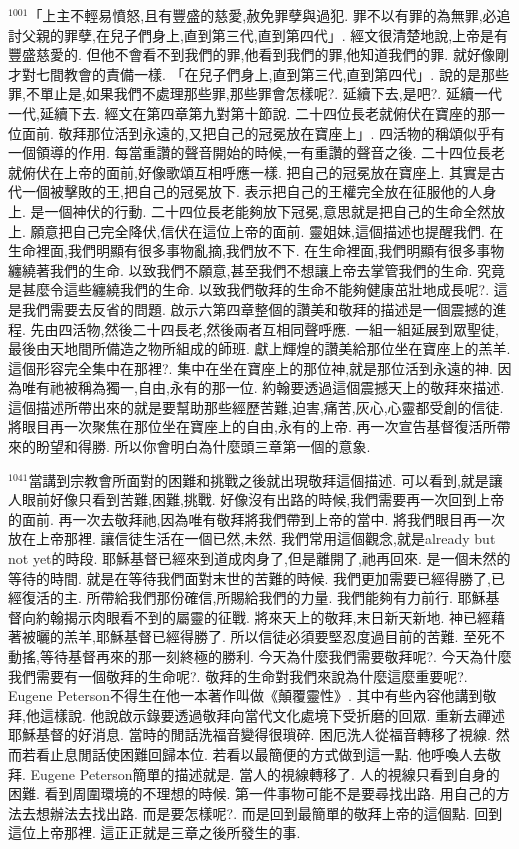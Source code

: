 \documentclass{book}
\begin{document}
$^{1001}$「上主不輕易憤怒,且有豐盛的慈愛,赦免罪孽與過犯.
罪不以有罪的為無罪,必追討父親的罪孽,在兒子們身上,直到第三代,直到第四代」.
經文很清楚地說,上帝是有豐盛慈愛的.
但他不會看不到我們的罪,他看到我們的罪,他知道我們的罪.
就好像剛才對七間教會的責備一樣.
「在兒子們身上,直到第三代,直到第四代」.
說的是那些罪,不單止是,如果我們不處理那些罪,那些罪會怎樣呢?.
延續下去,是吧?.
延續一代一代,延續下去.
經文在第四章第九對第十節說.
二十四位長老就俯伏在寶座的那一位面前.
敬拜那位活到永遠的,又把自己的冠冕放在寶座上」.
四活物的稱頌似乎有一個領導的作用.
每當重讚的聲音開始的時候,一有重讚的聲音之後.
二十四位長老就俯伏在上帝的面前,好像歌頌互相呼應一樣.
把自己的冠冕放在寶座上.
其實是古代一個被擊敗的王,把自己的冠冕放下.
表示把自己的王權完全放在征服他的人身上.
是一個神伏的行動.
二十四位長老能夠放下冠冕,意思就是把自己的生命全然放上.
願意把自己完全降伏,信伏在這位上帝的面前.
靈姐妹,這個描述也提醒我們.
在生命裡面,我們明顯有很多事物亂摘,我們放不下.
在生命裡面,我們明顯有很多事物纏繞著我們的生命.
以致我們不願意,甚至我們不想讓上帝去掌管我們的生命.
究竟是甚麼令這些纏繞我們的生命.
以致我們敬拜的生命不能夠健康茁壯地成長呢?.
這是我們需要去反省的問題.
啟示六第四章整個的讚美和敬拜的描述是一個震撼的進程.
先由四活物,然後二十四長老,然後兩者互相同聲呼應.
一組一組延展到眾聖徒,最後由天地間所備造之物所組成的師班.
獻上輝煌的讚美給那位坐在寶座上的羔羊.
這個形容完全集中在那裡?.
集中在坐在寶座上的那位神,就是那位活到永遠的神.
因為唯有祂被稱為獨一,自由,永有的那一位.
約翰要透過這個震撼天上的敬拜來描述.
這個描述所帶出來的就是要幫助那些經歷苦難,迫害,痛苦,灰心,心靈都受創的信徒.
將眼目再一次聚焦在那位坐在寶座上的自由,永有的上帝.
再一次宣告基督復活所帶來的盼望和得勝.
所以你會明白為什麼頭三章第一個的意象.

$^{1041}$當講到宗教會所面對的困難和挑戰之後就出現敬拜這個描述.
可以看到,就是讓人眼前好像只看到苦難,困難,挑戰.
好像沒有出路的時候,我們需要再一次回到上帝的面前.
再一次去敬拜祂,因為唯有敬拜將我們帶到上帝的當中.
將我們眼目再一次放在上帝那裡.
讓信徒生活在一個已然,未然.
我們常用這個觀念,就是already but not yet的時段.
耶穌基督已經來到道成肉身了,但是離開了,祂再回來.
是一個未然的等待的時間.
就是在等待我們面對末世的苦難的時候.
我們更加需要已經得勝了,已經復活的主.
所帶給我們那份確信,所賜給我們的力量.
我們能夠有力前行.
耶穌基督向約翰揭示肉眼看不到的屬靈的征戰.
將來天上的敬拜,末日新天新地.
神已經藉著被曬的羔羊,耶穌基督已經得勝了.
所以信徒必須要堅忍度過目前的苦難.
至死不動搖,等待基督再來的那一刻終極的勝利.
今天為什麼我們需要敬拜呢?.
今天為什麼我們需要有一個敬拜的生命呢?.
敬拜的生命對我們來說為什麼這麼重要呢?.
Eugene Peterson不得生在他一本著作叫做《顛覆靈性》.
其中有些內容他講到敬拜,他這樣說.
他說啟示錄要透過敬拜向當代文化處境下受折磨的回眾.
重新去禪述耶穌基督的好消息.
當時的閒話洗福音變得很瑣碎.
困厄洗人從福音轉移了視線.
然而若看止息閒話使困難回歸本位.
若看以最簡便的方式做到這一點.
他呼喚人去敬拜.
Eugene Peterson簡單的描述就是.
當人的視線轉移了.
人的視線只看到自身的困難.
看到周圍環境的不理想的時候.
第一件事物可能不是要尋找出路.
用自己的方法去想辦法去找出路.
而是要怎樣呢?.
而是回到最簡單的敬拜上帝的這個點.
回到這位上帝那裡.
這正正就是三章之後所發生的事.
\end{document}
